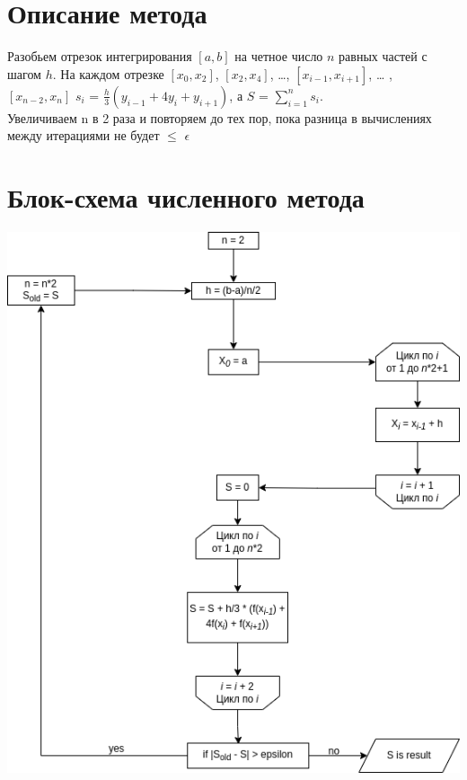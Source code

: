 \tableofcontents

\newpage



\section{Описание метода}
Разобьем отрезок интегрирования $[a, b]$ на четное число $n$ равных частей с шагом $h$. На
каждом отрезке $[x_0, x_2]$, $[x_2, x_4]$, …, $[x_{i-1}, x_{i+1}]$, … , $[x_{n-2}, x_n]$
$s_i$ = $\frac{h}{3}$$(y_{i-1} + 4y_i + y_{i+1})$, а $S$ = $\sum\limits_{i=1}^{n} s_i$. \\
Увеличиваем n в 2 раза и повторяем до тех пор, пока разница в вычислениях между итерациями не будет $\leq$ $\epsilon$


\section{Блок-схема численного метода}
\includegraphics[scale=0.3]{img/integrity}

